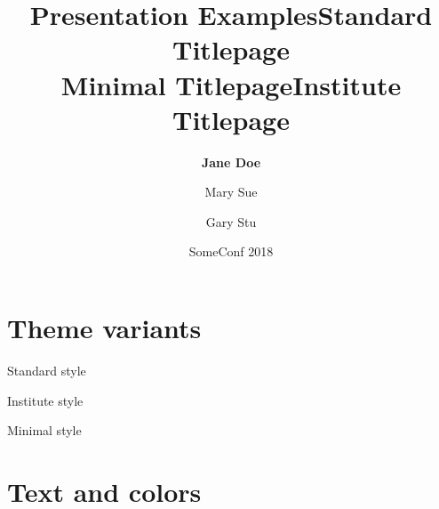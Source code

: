 \documentclass[table,aspectratio=43]{beamer}
\title[]{Presentation Examples}
\author[Jane Doe]{\textbf{Jane Doe} \and Mary Sue \and Gary Stu}
\date{SomeConf 2018}
\institute{IAIK}
\begin{document}
\begin{frame}[plain]
  \maketitle
\end{frame}

\begin{frame}
  \tableofcontents
\end{frame}

\section{Theme variants}

\switchtostandard
\title[]{Standard Titlepage\\Minimal Titlepage}
\begin{frame}[plain]
  \maketitle
\end{frame}

\switchtoinstitute
\title[]{Institute Titlepage}
\begin{frame}[plain]
  \maketitle
\end{frame}

\switchtostandard
\begin{frame}{Standard style}
\end{frame}
\switchtoinstitute
\begin{frame}{Institute style}
\end{frame}
\switchtominimal
\begin{frame}{Minimal style}
\end{frame}
\switchtostandard

\section{Text and colors}
\end{document}

